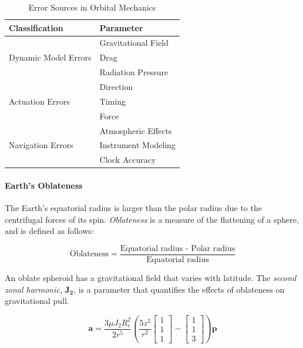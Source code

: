 \begin{table}[h!]
\centering
\begin{tabular}{@{}ll@{}}
\toprule
\textbf{Classification}                        & \textbf{Parameter}           \\ \midrule
\multirow{3}{*}{Dynamic Model Errors} & Gravitational Field \\
                                      & Drag                \\
                                      & Radiation Pressure  \\ \midrule
\multirow{3}{*}{Actuation Errors}     & Direction           \\
                                      & Timing              \\
                                      & Force               \\ \midrule
\multirow{3}{*}{Navigation Errors}    & Atmospheric Effects \\
                                      & Instrument Modeling \\
                                      & Clock Accuracy   \\    
\bottomrule
\end{tabular}%
\caption{Error Sources in Orbital Mechanics}
\label{table:error_sources}
\end{table}
    




\paragraph{Earth's Oblateness}

The Earth's equatorial radius is larger than the polar radius due to the centrifugal forces of its spin.  \textit{Oblateness} is a measure of the flattening of a sphere, and is defined as follows:

$$ \text{Oblateness} = \frac{\text{Equatorial radius - Polar radius}}{\text{Equatorial radius}} $$


An oblate spheroid has a gravitational field that varies with latitude. The \textit{second zonal harmonic}, $\mathbf{J_2}$, is a parameter that quantifies the effects of oblateness on gravitational pull. 


\begin{equation}
    \mathbf{a} = \frac{3 \mu J_2 R_e^2}{2 r^5} \left( \frac{5 z^2}{r^2} \begin{bmatrix} 1 \\ 1 \\ 1 \end{bmatrix} - \begin{bmatrix} 1 \\ 1 \\ 3 \end{bmatrix} \right) \mathbf{p}
\end{equation}{}


